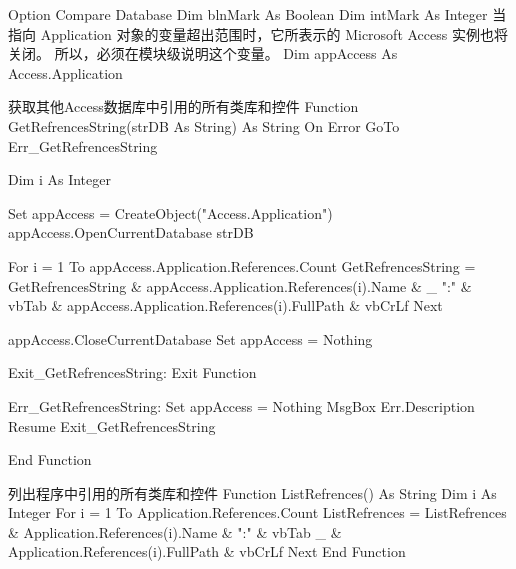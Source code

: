 \documentclass[
]{article}
\newenvironment{Shaded}{}{}
\newcommand{\NormalTok}[1]{#1}
\begin{document}
\begin{Shaded}
\begin{Highlighting}[]
\NormalTok{Option Compare Database}
\NormalTok{Dim blnMark As Boolean}
\NormalTok{Dim intMark As Integer}
\NormalTok{\textquotesingle{}当指向 Application 对象的变量超出范围时，它所表示的 Microsoft Access 实例也将关闭。}
\NormalTok{\textquotesingle{}所以，必须在模块级说明这个变量。}
\NormalTok{Dim appAccess As Access.Application}

\NormalTok{\textquotesingle{}获取其他Access数据库中引用的所有类库和控件}
\NormalTok{Function GetRefrencesString(strDB As String) As String}
\NormalTok{On Error GoTo Err\_GetRefrencesString}

\NormalTok{Dim i As Integer}

\NormalTok{    Set appAccess = CreateObject("Access.Application")}
\NormalTok{        appAccess.OpenCurrentDatabase strDB}
    
\NormalTok{    For i = 1 To appAccess.Application.References.Count}
\NormalTok{        GetRefrencesString = GetRefrencesString \& appAccess.Application.References(i).Name \& \_}
\NormalTok{                        ":" \& vbTab \& appAccess.Application.References(i).FullPath \& vbCrLf}
\NormalTok{    Next}
    
\NormalTok{        appAccess.CloseCurrentDatabase}
\NormalTok{    Set appAccess = Nothing}
   
\NormalTok{Exit\_GetRefrencesString:}
\NormalTok{    Exit Function}

\NormalTok{Err\_GetRefrencesString:}
\NormalTok{    Set appAccess = Nothing}
\NormalTok{    MsgBox Err.Description}
\NormalTok{    Resume Exit\_GetRefrencesString}

\NormalTok{End Function}
\end{Highlighting}
\end{Shaded}

\begin{Shaded}
\begin{Highlighting}[]
\NormalTok{\textquotesingle{}列出程序中引用的所有类库和控件}
\NormalTok{Function ListRefrences() As String}
\NormalTok{Dim i As Integer}
\NormalTok{For i = 1 To Application.References.Count}
\NormalTok{     ListRefrences = ListRefrences \& Application.References(i).Name \& ":" \& vbTab \_}
\NormalTok{                            \& Application.References(i).FullPath \& vbCrLf}
\NormalTok{Next}
\NormalTok{End Function}
\end{Highlighting}
\end{Shaded}
\end{document}
